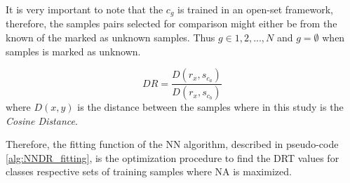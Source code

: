 It is very important to note that the $c_{g}$ is trained in an open-set framework, therefore, the samples pairs selected for comparison might either be from the known of the marked as unknown samples. Thus $g \in {1,2,...,N}$ and $g = \emptyset$ when samples is marked as unknown.

\begin{equation} \label{eq:DR}
    DR = \frac{D(r_{x}, s_{c_{a}})}{D(r_{x}, s_{c_{b}})}
\end{equation}
\noindent
where $D(x,y)$ is the distance between the samples where in this study is the \textit{Cosine Distance}.

Therefore, the fitting function of the NN algorithm, described in pseudo-code \ref{alg:NNDR_fitting}, is the optimization procedure to find the DRT values for classes respective sets of training samples where NA is maximized.

\hfill \break


